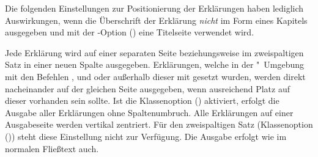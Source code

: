 \begin{DeclareEntity*}{}
\begin{DeclareEntity*}{}
\begin{DeclareEntity*}{}
\begin{Declaration}
Die folgenden Einstellungen zur Positionierung der Erklärungen haben lediglich 
Auswirkungen, wenn die Überschrift der Erklärung \emph{nicht} im Form eines 
Kapitels ausgegeben und mit der \KOMAScript-Option 
() eine Titelseite verwendet wird.
\begin{DeclareValues}
  Jede Erklärung wird auf einer separaten Seite
  beziehungsweise im zweispaltigen Satz in einer neuen Spalte ausgegeben.
  Erklärungen, welche in der "~Umgebung mit den 
  Befehlen ,  und  oder 
  außerhalb dieser mit  gesetzt wurden, werden direkt 
  nacheinander auf der gleichen Seite ausgegeben, wenn ausreichend Platz auf 
  dieser vorhanden sein sollte. Ist die Klassenoption 
  () aktiviert, erfolgt die Ausgabe aller 
  Erklärungen ohne Spaltenumbruch.
  Alle Erklärungen auf einer Ausgabeseite werden vertikal zentriert. Für 
  den zweispaltigen Satz 
  (Klassenoption ()) steht diese 
  Einstellung nicht zur Verfügung.
  Die Ausgabe erfolgt wie im normalen Fließtext auch.
\end{DeclareValues}
\end{Declaration}


\end{DeclareEntity*}
\end{DeclareEntity*}
\end{DeclareEntity*}
